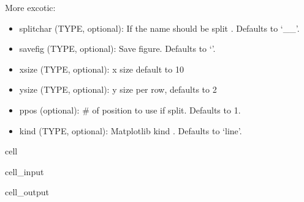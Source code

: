 \documentclass[letterpaper,10pt,english]{jupyterBook}
\begin{document}
\sphinxAtStartPar
More excotic:
\begin{itemize}
\item {} 
\sphinxAtStartPar
splitchar (TYPE, optional): If the name should be split . Defaults to ‘\_\_’.

\item {} 
\sphinxAtStartPar
savefig (TYPE, optional): Save figure. Defaults to ‘’.

\item {} 
\sphinxAtStartPar
xsize  (TYPE, optional): x size default to 10

\item {} 
\sphinxAtStartPar
ysize  (TYPE, optional): y size per row, defaults to 2

\item {} 
\sphinxAtStartPar
ppos (optional): \# of position to use if split. Defaults to \sphinxhyphen{}1.

\item {} 
\sphinxAtStartPar
kind (TYPE, optional): Matplotlib kind . Defaults to ‘line’.

\end{itemize}

\begin{sphinxuseclass}{cell}\begin{sphinxVerbatimInput}

\begin{sphinxuseclass}{cell_input}
\begin{sphinxVerbatim}[commandchars=\\\{\}]
\PYG{p}{[}\PYG{p}{]}  
\end{sphinxVerbatim}

\end{sphinxuseclass}\end{sphinxVerbatimInput}
\begin{sphinxVerbatimOutput}

\begin{sphinxuseclass}{cell_output}
\noindent{}

\end{sphinxuseclass}\end{sphinxVerbatimOutput}

\end{sphinxuseclass}
\end{document}
